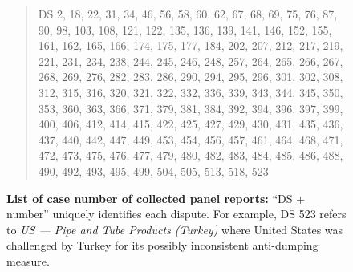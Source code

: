 \begin{figure}[h]
    \begin{quote}
        DS 2, 
        18, 
        22, 
        31, 
        34, 
        46, 
        56, 
        58, 
        60, 
        62, 
        67, 
        68, 
        69, 
        75, 
        76, 
        87, 
        90, 
        98, 
        103, 
        108, 
        121, 
        122, 
        135, 
        136, 
        139, 
        141, 
        146, 
        152, 
        155, 
        161, 
        162, 
        165, 
        166, 
        174, 
        175, 
        177, 
        184, 
        202, 
        207, 
        212, 
        217, 
        219, 
        221, 
        231, 
        234, 
        238, 
        244, 
        245, 
        246, 
        248, 
        257, 
        264, 
        265, 
        266, 
        267, 
        268, 
        269, 
        276, 
        282, 
        283, 
        286, 
        290, 
        294, 
        295, 
        296, 
        301, 
        302, 
        308, 
        312, 
        315, 
        316, 
        320, 
        321, 
        322, 
        332, 
        336, 
        339, 
        343, 
        344, 
        345, 
        350, 
        353, 
        360, 
        363, 
        366, 
        371, 
        379, 
        381, 
        384, 
        392, 
        394, 
        396, 
        397, 
        399, 
        400, 
        406, 
        412, 
        414, 
        415, 
        422, 
        425, 
        427, 
        429, 
        430, 
        431, 
        435, 
        436, 
        437, 
        440, 
        442, 
        447, 
        449, 
        453, 
        454, 
        456, 
        457, 
        461, 
        464, 
        468, 
        471, 
        472, 
        473, 
        475, 
        476, 
        477, 
        479, 
        480, 
        482, 
        483, 
        484, 
        485, 
        486, 
        488, 
        490, 
        492, 
        493, 
        495, 
        499, 
        504, 
        505, 
        513, 
        518, 
        523
    \end{quote}
    \caption{
        \textbf{List of case number of collected panel reports:} ``DS + number'' uniquely identifies each dispute. For example, DS 523 refers to \textit{US — Pipe and Tube Products (Turkey)} where United States was challenged by Turkey for its possibly inconsistent anti-dumping measure.
    }
    \label{fig:ds-cases-used}
\end{figure}

